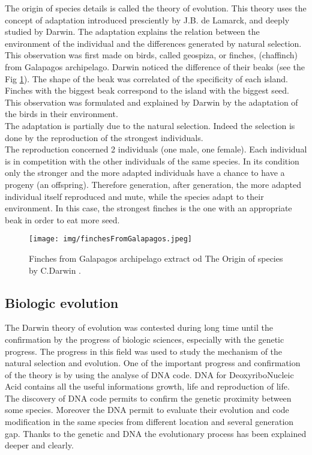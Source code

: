 The origin of species details is called the theory of evolution. 
This theory uses the concept of adaptation introduced presciently by J.B. de Lamarck, and deeply studied by Darwin. The adaptation explains the relation between the environment of the individual and the differences generated by natural selection. This observation was first made on birds, called geospiza, or finches, (chaffinch) from Galapagos archipelago. Darwin noticed the difference of their beaks (see the Fig \ref{fig:finchesFromGalapagos}). The shape of the beak was correlated of the specificity of each island. Finches with the biggest beak correspond to the island with the biggest seed. \\
This observation was formulated and explained by Darwin by the adaptation of the birds in their environment.\\ The adaptation is partially due to the natural selection. Indeed the selection is done by the reproduction of the strongest individuals.\\
The reproduction concerned 2 individuals (one male, one female). Each individual is in competition with the other individuals of the same species. In its condition only the stronger and  the more adapted individuals   have a chance to have a progeny (an offspring). Therefore generation, after generation, the more adapted individual itself reproduced and mute, while the species adapt to their environment.
In this case, the strongest finches is the one with an appropriate beak in order to eat more seed. 
\begin{figure}[t!]
   \texttt{[image: img/finchesFromGalapagos.jpeg]}
  \caption{Finches from Galapagos archipelago extract od The Origin of species by C.Darwin .}\label{fig:finchesFromGalapagos}
  \endminipage\hfill
\end{figure}

\subsection{Biologic evolution }\label{subsec:BioEvolv}

The Darwin theory of evolution was contested during long time until the confirmation by the progress of biologic sciences, especially with the genetic progress. The progress in this field was used to study the mechanism of the natural selection and evolution. One of the important progress and confirmation of the theory is by using the analyse of DNA code. DNA for DeoxyriboNucleic Acid contains all the useful informations growth, life and reproduction of life.   \\
The discovery of DNA code permits to confirm the genetic proximity between some species. Moreover the DNA permit to evaluate their evolution and code modification in the same species from different location and several generation gap. %
Thanks to the genetic  and DNA the evolutionary process has been explained deeper and clearly. 



